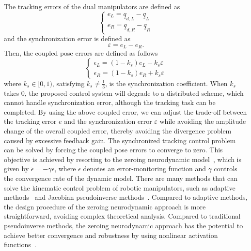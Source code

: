 \documentclass[journal,twoside,web]{ieeecolor}
\begin{document}
The tracking errors of the dual manipulators are defined as
\begin{equation}
\left\{\begin{aligned}
e_L = \underline{q}_{d,L} - \underline{q}_{L} \\
e_R = \underline{q}_{d,R} - \underline{q}_{R}
\end{aligned}\right.
\label{eq:tracking error}
\end{equation}
and the synchronization error is defined as
\begin{equation}
\varepsilon = e_L - e_R.
\end{equation}
Then, the coupled pose errors are defined as follows
\begin{equation}
\left\{\begin{aligned}
\epsilon_L = (1-k_s)e_L - k_s \varepsilon \\
\epsilon_R = (1-k_s)e_R + k_s \varepsilon
\end{aligned}\right.
\label{eq:coupled error}
\end{equation}
where $k_s \in [0,1)$, satisfying $k_s \ne \frac{1}{3}$, is the synchronization coefficient. When $k_s$ takes 0, the proposed control system will degrade to a distributed scheme, which cannot handle synchronization error, although the tracking task can be completed. By using the above coupled error, we can adjust the trade-off between the tracking error $e$ and the synchronization error $\varepsilon$ while avoiding the amplitude change of the overall coupled error, thereby avoiding the divergence problem caused by excessive feedback gain. The synchronized tracking control problem can be solved by forcing the coupled pose errors to converge to zero. This objective is achieved by resorting to the zeroing neurodynamic model~\cite{Zhang2015}, which is given by $\dot{\epsilon} = - \gamma \epsilon$, where $\epsilon$ denotes an error-monitoring function and $\gamma$ controls the convergence rate of the dynamic model. There are many methods that can solve the kinematic control problem of robotic manipulators, such as adaptive methods~\cite{Wang2020IFAC} and Jacobian pseudoinverse methods~\cite{Liao2015Robotica}. Compared to adaptive methods, the design procedure of the zeroing neurodynamic approach is more straightforward, avoiding complex theoretical analysis. Compared to traditional pseudoinverse methods, the zeroing neurodynamic approach has the potential to achieve better convergence and robustness by using nonlinear activation functions~\cite{Tan2022JAS}.
\end{document}
